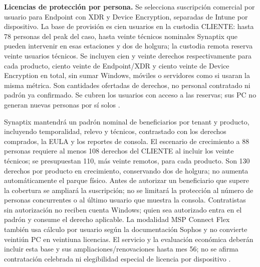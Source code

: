 \textbf{Licencias de protección por persona.} Se selecciona suscripción comercial por usuario para Endpoint con XDR y Device Encryption, separadas de Intune por dispositivo. La base de provisión es cien usuarios en la custodia CLIENTE: hasta 78 personas del peak del caso, hasta veinte técnicos nominales Synaptix que pueden intervenir en esas estaciones y dos de holgura; la custodia remota reserva veinte usuarios técnicos. Se incluyen cien y veinte derechos respectivamente para cada producto, ciento veinte de Endpoint/XDR y ciento veinte de Device Encryption en total, sin sumar Windows, móviles o servidores como si usaran la misma métrica. Son cantidades ofertadas de derechos, no personal contratado ni padrón ya confirmado. Se cubren los usuarios con acceso a las reservas; sus PC no generan nuevas personas por sí solos \parencites[secc.~2.4]{caso07}{p4-sophos-licencias}.

Synaptix mantendrá un padrón nominal de beneficiarios por tenant y producto, incluyendo temporalidad, relevo y técnicos, contrastado con los derechos comprados, la EULA y los reportes de consola. El escenario de crecimiento a 88 personas requiere al menos 108 derechos del CLIENTE al incluir los veinte técnicos; se presupuestan 110, más veinte remotos, para cada producto. Son 130 derechos por producto en crecimiento, conservando dos de holgura; no aumenta automáticamente el parque físico. Antes de autorizar un beneficiario que supere la cobertura se ampliará la suscripción; no se limitará la protección al número de personas concurrentes o al último usuario que muestra la consola. Contratistas sin autorización no reciben cuenta Windows; quien sea autorizado entra en el padrón y consume el derecho aplicable. La modalidad MSP Connect Flex también usa cálculo por usuario según la documentación Sophos y no convierte veintiún PC en veintiuna licencias. El servicio y la evaluación económica deberán incluir esta base y sus ampliaciones/renovaciones hasta mes 56; no se afirma contratación celebrada ni elegibilidad especial de licencia por dispositivo \parencite{p4-sophos-licencias}.

